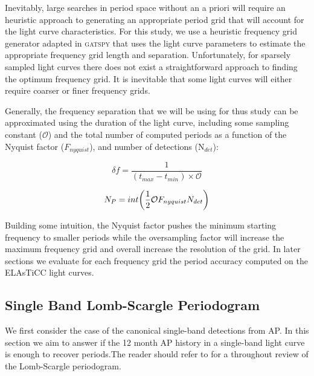 \documentclass[DM,authoryear,toc]{lsstdoc}
\begin{document}
Inevitably, large searches in period space without an a priori will require an heuristic approach to generating an appropriate period grid that will account for the light curve characteristics.
For this study, we use a heuristic frequency grid generator adapted in \textsc{gatspy} that uses the light curve parameters to estimate the appropriate frequency grid length and separation.
Unfortunately, for sparsely sampled light curves there does not exist a straightforward approach to finding the optimum frequency grid.
It is inevitable that some light curves will either require coarser or finer frequency grids.

Generally, the frequency separation that we will be using for thus study can be approximated using the duration of the light curve, including some sampling constant ($\mathcal{O}$) and the total number of computed periods as a function of the Nyquist factor ($F_{nyquist}$), and number of detections (N$_{det}$): 

\begin{equation}
\delta f = \frac{1}{(t_{max} - t_{min}) \times \mathcal{O}}
\end{equation}

\begin{equation}
N_{P} = int \bigg{(} \frac{1}{2} \mathcal{O} F_{nyquist} N_{det} \bigg{)}
\end{equation}

Building some intuition, the Nyquist factor pushes the minimum starting frequency to smaller periods while the oversampling factor will increase the maximum frequency grid and overall increase the resolution of the grid. In later sections we evaluate for each frequency grid the period accuracy computed on the ELAsTiCC light curves.


\subsection{Single Band Lomb-Scargle Periodogram}
We first consider the case of the canonical single-band detections from AP. In this section we aim to answer if the 12 month AP history in a single-band light curve is enough to recover periods.The reader should refer to \citet{VanderPlas:VP2015} for a throughout review of the Lomb-Scargle periodogram.
  
\end{document}
